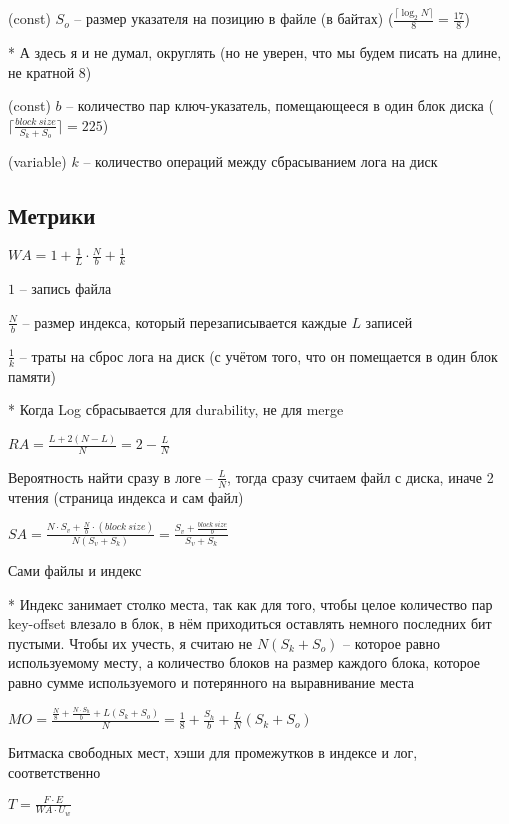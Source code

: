 (const) $S_o$ -- размер указателя на позицию в файле (в байтах) ($ \frac{\lceil\log_2N\rceil}{8} = \frac{17}{8}$)

* А здесь я и не думал, округлять (но не уверен, что мы будем писать на длине, не кратной 8)

(const) $b$ -- количество пар ключ-указатель, помещающееся в один блок диска ($\lceil\frac{block\ size}{S_k + S_o}\rceil = 225$)

(variable) $k$ -- количество операций между сбрасыванием лога на диск

\subsection*{Метрики}

\large$WA = 1 + \frac{1}{L}\cdot\frac{N}{b} + \frac{1}{k}$\normalsize

$1$ -- запись файла

$\frac{N}{b}$ -- размер индекса, который перезаписывается каждые $L$ записей

$\frac{1}{k}$ -- траты на сброс лога на диск (с учётом того, что он помещается в один блок памяти)

* Когда Log сбрасывается для durability, не для merge

\large$RA = \frac{L + 2(N-L)}{N} = 2 - \frac{L}{N}$\normalsize

Вероятность найти сразу в логе -- $\frac{L}{N}$, тогда сразу считаем файл с диска, иначе 2 чтения (страница индекса и сам файл)

\large$SA = \frac{N\cdot S_v + \frac{N}{b}\cdot (block\ size)}{N(S_v + S_k)} = \frac{S_v + \frac{block\ size}{b}}{S_v + S_k}$\normalsize

Сами файлы и индекс

* Индекс занимает столко места, так как для того, чтобы целое количество пар key-offset влезало в блок, в нём приходиться оставлять немного последних бит пустыми. Чтобы их учесть, я считаю не $N(S_k + S_o)$ -- которое равно используемому месту, а количество блоков на размер каждого блока, которое равно сумме используемого и потерянного на выравнивание места

\large$MO = \frac{\frac{N}{8} + \frac{N\cdot S_h}{b} + L(S_k + S_o)}{N} = \frac{1}{8} + \frac{S_h}{b} + \frac{L}{N}(S_k + S_o)$\normalsize

Битмаска свободных мест, хэши для промежутков в индексе и лог, соответственно

\large$T = \frac{F\cdot E}{WA\cdot U_w}$\normalsize

